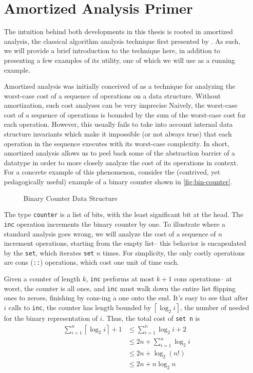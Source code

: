

\section{Amortized Analysis Primer}
\label{sec:amortized-primer}
The intuition behind both developments in this thesis is rooted in amortized analysis, the classical algorithm analysis technique first presented by \citet{tarjan:amortized-complexity}. As such, we will provide a brief introduction to the technique here, in addition to presenting a few examples of its utility, one of which we will use as a running example.

Amortized analysis was initially conceived of as a technique for analyzing the worst-case cost of a sequence of operations on a data structure. Without amortization, such cost analyses can be very imprecise Naively, the worst-case cost of a sequence of operations is bounded by the sum of the worst-case cost for each operation. However, this usually fails to take into account internal data structure invariants which make it impossible (or not always true) that each operation in the sequence executes with its worst-case complexity. In short, amortized analysis allows us to peel back some of the abstraction barrier of a datatype in order to more closely analyze the cost of its operations in context. For a concrete example of this phenomenon, consider the (contrived, yet pedagogically useful) example of a binary counter shown in \autoref{fig:bin-counter}.

\begin{figure}
  \caption{Binary Counter Data Structure}
  \label{fig:bin-counter}
\end{figure}

The type \texttt{counter} is a list of bits, with the least significant bit at the head. The \texttt{inc} operation increments the binary counter by one. To illustrate where a standard analysis goes wrong, we will analyze the cost of a sequence of $n$ increment operations, starting from the empty list-- this behavior is encapsulated by the \texttt{set}, which iterates \texttt{set} $n$ times. For simplicity, the only costly operations are cons (\texttt{::}) operations, which cost one unit of time each.

Given a counter of length $k$, \texttt{inc} performs at most $k + 1$ cons operations-- at worst, the counter is all ones, and \texttt{inc} must walk down the entire list flipping ones to zeroes, finishing by cons-ing a one onto the end. It's easy to see that after $i$ calls to \texttt{inc}, the counter has length bounded by $\left \lceil{\log_2 i}\right \rceil$, the number of needed for the binary representation of $i$. Thus, the total cost of \texttt{set n} is
\begin{align*}
  \sum_{i=1}^n \left\lceil{\log_2 i}\right \rceil + 1
  &\leq \sum_{i=1}^n \log_2 i + 2\\
  &\leq 2n + \sum_{i=1}^n \log_2 i\\
  &\leq 2n + \log_2(n!)\\
  &\leq 2n + n\log_2 n
\end{align*}


